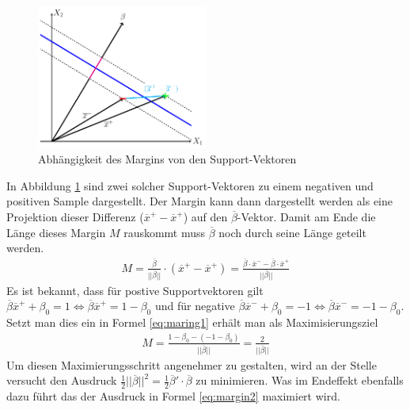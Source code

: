 \documentclass[
]{article}
\begin{document}
\begin{figure}[h]
\centering
 \includegraphics[width=0.5\textwidth,trim=0.5cm 0.5cm 0.5cm 0.5cm]{Images/margin.pdf} 
        \caption{Abhängigkeit des Margins von den Support-Vektoren}
        \label{fig:SupVecs}
\end{figure}

In Abbildung \ref{fig:SupVecs} sind zwei solcher Support-Vektoren zu
einem negativen und positiven Sample dargestellt. Der Margin kann dann
dargestellt werden als eine Projektion dieser Differenz
(\(\overline{x}^+-\overline{x}^+\)) auf den \(\overline{\beta}\)-Vektor.
Damit am Ende die Länge dieses Margin \(M\) rauskommt muss
\(\overline{\beta}\) noch durch seine Länge geteilt werden.
\begin{align}
M=\frac{\overline{\beta}}{||\overline{\beta}||}\cdot \left(\overline{x}^+-\overline{x}^+\right)=\frac{\overline{\beta}\cdot\overline{x}^- -\overline{\beta}\cdot\overline{x}^+}{||\overline{\beta}||}\label{eq:maring1}
\end{align} Es ist bekannt, dass für postive Supportvektoren gilt
\(\overline\beta \overline{x}^+ +\beta_0 = 1 \Leftrightarrow \overline\beta \overline{x}^+=1-\beta_0\)
und für negative
\(\overline\beta \overline{x}^- +\beta_0 = -1 \Leftrightarrow \overline\beta \overline{x}^-=-1-\beta_0\).
Setzt man dies ein in Formel \ref{eq:maring1} erhält man als
Maximisierungsziel \begin{align}
M=\frac{1-\beta_0-(-1-\beta_0)}{||\overline\beta||}=\frac{2}{||\overline\beta||}\label{eq:margin2}
\end{align} Um diesen Maximierungsschritt angenehmer zu gestalten, wird
an der Stelle versucht den Ausdruck
\(\frac{1}{2}||\overline \beta||^2=\frac{1}{2}\overline \beta '\cdot \overline \beta\)
zu minimieren. Was im Endeffekt ebenfalls dazu führt das der Ausdruck in
Formel \ref{eq:margin2} maximiert wird.
\end{document}
